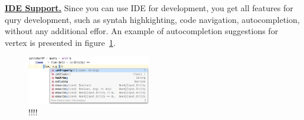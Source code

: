 \underline{\textbf{IDE Support.}}
Since you can use IDE for development, you get all features for qury development, such as syntah highkighting, code navigation, autocompletion, without any additional effor.
An example of autocompletion suggestions for vertex is presented in figure~\ref{fig:autocompletion}.

\begin{figure}[ht]
    \centering
    \includegraphics[width=0.48\textwidth]{pictures/image1.png}
    \caption{!!!!}
    \label{fig:autocompletion}
\end{figure}

